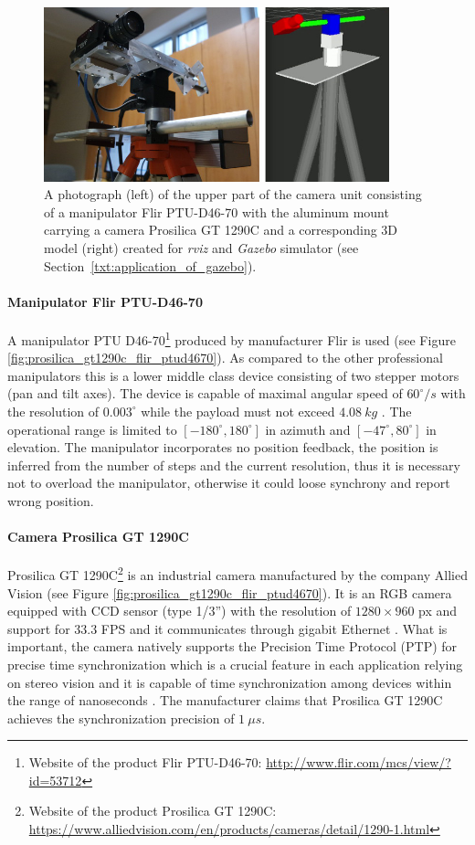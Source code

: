 \begin{figure}[tbh]
	\centering
	\includegraphics[width=10cm]{fig/camera_unit_photo_model.jpg}
	\caption{A photograph (left) of the upper part of the camera unit consisting of a manipulator Flir PTU-D46-70 with the aluminum mount carrying a camera Prosilica GT 1290C and a corresponding 3D model (right) created for \textit{rviz} and \textit{Gazebo} simulator (see Section~\ref{txt:application_of_gazebo}).}
	\label{fig:camera_unit_photo_model}
\end{figure}

\paragraph{Manipulator Flir PTU-D46-70} A manipulator PTU D46-70\footnote{Website of the product Flir PTU-D46-70: \url{http://www.flir.com/mcs/view/?id=53712}} produced by manufacturer Flir is used (see Figure \ref{fig:prosilica_gt1290c_flir_ptud4670}). As compared to the other professional manipulators this is a lower middle class device consisting of two stepper motors (pan and tilt axes). The device is capable of maximal angular speed of $60^{\circ}/s$ with the resolution of $0.003^{\circ}$ while the payload must not exceed $4.08~kg$ \cite{Flir_ptud4670}. The operational range is limited to $[-180^{\circ}, 180^{\circ}]$ in azimuth and $[-47^{\circ}, 80^{\circ}]$ in elevation. The manipulator incorporates no position feedback, the position is inferred from the number of steps and the current resolution, thus it is necessary not to overload the manipulator, otherwise it could loose synchrony and report wrong position.

\paragraph{Camera Prosilica GT 1290C} Prosilica GT 1290C\footnote{Website of the product Prosilica GT 1290C: \url{https://www.alliedvision.com/en/products/cameras/detail/1290-1.html}} is an industrial camera manufactured by the company Allied Vision (see Figure \ref{fig:prosilica_gt1290c_flir_ptud4670}). It is an RGB camera equipped with CCD sensor (type 1/3'') with the resolution of $1280 \times 960$ px and support for $33.3$ FPS and it communicates through gigabit Ethernet \cite{Prosilica_gt1290c}. What is important, the camera natively supports the Precision Time Protocol (PTP) for precise time synchronization which is a crucial feature in each application relying on stereo vision and it is capable of time synchronization among devices within the range of nanoseconds \cite{PTP}. The manufacturer claims that Prosilica GT 1290C achieves the synchronization precision of $1~\mu s$.

